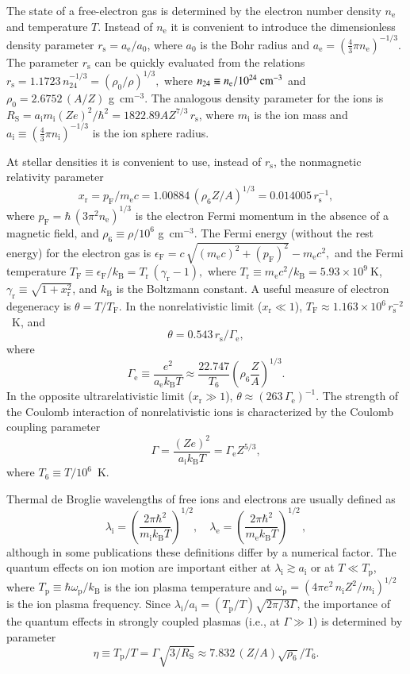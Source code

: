\documentclass[traditabstract]{aa}
\newcommand{\beq}{\begin{equation}}
\newcommand{\eeq}{\end{equation}}
\newcommand{\ael}{a_\mathrm{e}}
\newcommand{\aion}{a_\mathrm{i}}
\newcommand{\Gamme}{\Gamma_\mathrm{e}}
\newcommand{\gr}{\gamma_\mathrm{r}}
\newcommand{\EF}{\epsilon_\mathrm{F}}
\newcommand{\lambde}{\lambda_\mathrm{e}}
\newcommand{\lambdi}{\lambda_\mathrm{i}}
\newcommand{\mel}{m_\mathrm{e}}
\newcommand{\mion}{m_\mathrm{i}}
\newcommand{\nel}{n_\mathrm{e}}
\newcommand{\nion}{n_\mathrm{i}}
\newcommand{\kB}{k_\mathrm{B}}
\newcommand{\omp}{\omega_\mathrm{p}}
\newcommand{\pF}{p_\mathrm{F}}
\newcommand{\rs}{r_\mathrm{s}}
\newcommand{\RS}{R_\mathrm{S}}
\newcommand{\TF}{T_\mathrm{F}}
\newcommand{\Tp}{T_\mathrm{p}}
\newcommand{\Tr}{T_\mathrm{r}}
\newcommand{\xr}{x_\mathrm{r}}
\begin{document}
The state of a free-electron gas is determined by the
electron number density $\nel$ and temperature $T$. Instead
of $\nel$ it is convenient to introduce the dimensionless
density parameter $\rs=\ael/a_0$, where $a_0$ is
the Bohr radius and $\ael=(\frac43\pi \nel)^{-1/3}$. The
parameter $\rs$ can be quickly evaluated from the
relations
$
   \rs = 1.1723 \,n_{24}^{-1/3}=(\rho_0/\rho)^{1/3},
$
where $n_{24} \equiv \nel/10^{24}{\rm~cm}^{-3}$
and $\rho_0=2.6752\,(A/ Z)$ g~cm$^{-3}$.
The analogous density parameter for the
ions is 
$\RS=\aion \mion (Ze)^2/\hbar^2 = 1822.89AZ^{7/3}\,
\rs$,
where $\mion$ is the ion mass
and $\aion\equiv(\frac43\pi \nion)^{-1/3}$ is the ion sphere radius.

At stellar densities it is convenient to use, instead of $\rs$,
the nonmagnetic relativity parameter
\begin{equation}
    \xr  = \pF / \mel c = 1.00884 \,
       \left( \rho_6  Z / A 
       \right)^{1/3}\!\! = 0.014005\,\rs^{-1},
\label{x_r}
\end{equation}
%
where $ \pF = \hbar \,(3 \pi^2 \nel)^{1/3}$
is the electron Fermi momentum in the absence of a magnetic
field, and $\rho_6\equiv\rho/10^6$ g~cm$^{-3}$.
The Fermi energy (without the rest energy) for the electron gas is
$\EF = c\,\sqrt{(\mel c)^2 + (\pF)^2}-\mel c^2 ,
$
and the Fermi temperature $\TF \equiv \EF/\kB
= \Tr  \, ( \gr - 1) ,$
where 
$\Tr \equiv {\mel c^2 / \kB } = 5.93\times
10^9~\mathrm{K}$,
$\gr \equiv \sqrt{1+ \xr^2}$,
and $\kB$ is the Boltzmann constant.
A useful measure of electron degeneracy is $\theta=T/\TF$.
In the nonrelativistic limit ($\xr\ll1$),
$\TF\approx 1.163\times10^6\, \rs^{-2}$~K,
and
\beq
   \theta = 0.543\,\rs/\Gamme,
\label{theta}
\eeq
where
\beq
    \Gamme \equiv \frac{ e^2 }{ \ael \kB T}
   \approx \frac{22.747}{ T_6}
       \left(\rho_6 \frac{  Z  }{ A}
       \right)^{1/3}.
\eeq
In the opposite ultrarelativistic limit ($\xr\gg1$),
$\theta\approx(263\,\Gamme)^{-1}$.
The strength of the Coulomb interaction of nonrelativistic ions
is characterized by the Coulomb coupling parameter
%
\begin{equation}
   \Gamma =
        \frac{(Z e)^2}{\aion  \kB T} = \Gamme Z^{5/3},
\end{equation}
%
where $T_6\equiv T/10^6$~K.

Thermal de Broglie wavelengths of free ions and electrons are
usually defined as
\beq
   \lambdi = \left(\frac{2\pi\hbar^2}{ \mion \kB T}\right)^{1/2},
\quad
   \lambde = \left(\frac{2\pi\hbar^2}{ \mel \kB
          T}\right)^{1/2}\,,
\label{lambda-th}
\end{equation}
although in some publications these definitions differ by a
numerical factor.
The quantum effects on ion motion are important
either at $\lambdi\gtrsim \aion$ or at 
$T \ll \Tp$, where $\Tp \equiv \hbar \omp/ \kB$
is the ion plasma temperature and
%
$
    \omp = \left(  {4 \pi e^2 \,\nion}
     Z^2 /\mion \right)^{1/2}
$
%
is the ion plasma frequency.
Since $\lambdi/\aion=(\Tp/T)\sqrt{2\pi/3\Gamma}$, %
the importance of the quantum effects in strongly coupled
plasmas (i.e., at $\Gamma\gg1$) is determined by parameter
\beq
   \eta \equiv \Tp/T = \Gamma\sqrt{3/\RS}
       \approx 7.832\, (Z/A)\sqrt{\rho_6}/T_6.
\eeq
\end{document}
